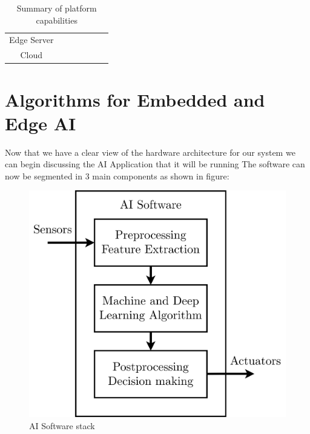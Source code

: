 \documentclass{article}
\begin{document}
\begin{table}[H]
{\begin{tabular}{|cc|cccccc|}
        \multicolumn{2}{|c|}{Edge Server}                                        & \cellcolor[HTML]{34FF34}           & \cellcolor[HTML]{34FF34}            & \cellcolor[HTML]{34FF34}                     & \cellcolor[HTML]{34FF34}            & \cellcolor[HTML]{34FF34}             & \cellcolor[HTML]{34FF34} \\ \cline{1-2}
        \multicolumn{2}{|c|}{Cloud}                                              & \cellcolor[HTML]{34FF34}           & \cellcolor[HTML]{34FF34}            & \cellcolor[HTML]{34FF34}                     & \cellcolor[HTML]{34FF34}            & \cellcolor[HTML]{34FF34}             & \cellcolor[HTML]{34FF34} \\ \hline
      \end{tabular}%
      }
      \caption{Summary of platform capabilities}
      \end{table}

  \newpage

  \section{Algorithms for Embedded and Edge AI}
    Now that we have a clear view of the hardware architecture for our system we can begin discussing the AI Application that it will be running
    The software can now be segmented in 3 main components as shown in figure: 

    \begin{figure}[H]
      \includegraphics[scale=0.15]{../Images/AI_software.png}
      \centering
      \caption{AI Software stack}
    \end{figure}
\end{document}
